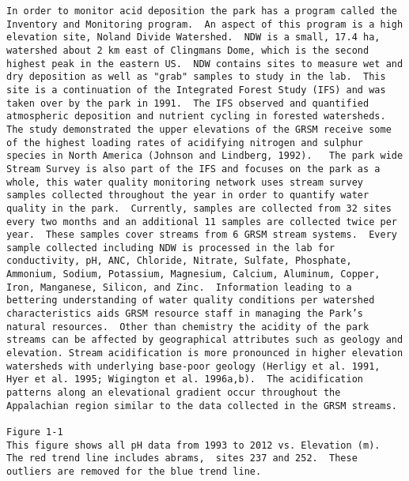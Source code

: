 \begin{verbatim}
In order to monitor acid deposition the park has a program called the Inventory and Monitoring program.  An aspect of this program is a high elevation site, Noland Divide Watershed.  NDW is a small, 17.4 ha, watershed about 2 km east of Clingmans Dome, which is the second highest peak in the eastern US.  NDW contains sites to measure wet and dry deposition as well as "grab" samples to study in the lab.  This site is a continuation of the Integrated Forest Study (IFS) and was taken over by the park in 1991.  The IFS observed and quantified atmospheric deposition and nutrient cycling in forested watersheds.  The study demonstrated the upper elevations of the GRSM receive some of the highest loading rates of acidifying nitrogen and sulphur species in North America (Johnson and Lindberg, 1992).   The park wide Stream Survey is also part of the IFS and focuses on the park as a whole, this water quality monitoring network uses stream survey samples collected throughout the year in order to quantify water quality in the park.  Currently, samples are collected from 32 sites every two months and an additional 11 samples are collected twice per year.  These samples cover streams from 6 GRSM stream systems.  Every sample collected including NDW is processed in the lab for conductivity, pH, ANC, Chloride, Nitrate, Sulfate, Phosphate, Ammonium, Sodium, Potassium, Magnesium, Calcium, Aluminum, Copper, Iron, Manganese, Silicon, and Zinc.  Information leading to a bettering understanding of water quality conditions per watershed characteristics aids GRSM resource staff in managing the Park’s natural resources.  Other than chemistry the acidity of the park streams can be affected by geographical attributes such as geology and elevation. Stream acidification is more pronounced in higher elevation watersheds with underlying base-poor geology (Herligy et al. 1991, Hyer et al. 1995; Wigington et al. 1996a,b).  The acidification patterns along an elevational gradient occur throughout the Appalachian region similar to the data collected in the GRSM streams.  

Figure 1-1 
This figure shows all pH data from 1993 to 2012 vs. Elevation (m).  The red trend line includes abrams,  sites 237 and 252.  These outliers are removed for the blue trend line.


\end{verbatim}
